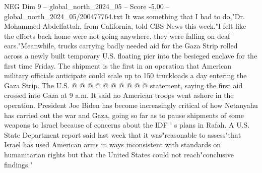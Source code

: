 \begin{textsample}{NEG Dim 9 – global\_north\_2024\_05 – Score -5.00 – global\_north\_2024\_05/200477764.txt}
It was something that I had to do,"Dr.
Mohammed Abdelfattah, from California, told CBS News this week."I felt like the efforts back home were not going anywhere, they were falling on deaf ears."Meanwhile, trucks carrying badly needed aid for the Gaza Strip rolled across a newly built temporary U.S. floating pier into the besieged enclave for the first time Friday.
The shipment is the first in an operation that American military officials anticipate could scale up to 150 truckloads a day entering the Gaza Strip.
The U.S. @ @ @ @ @ @ @ @ @ @ statement, saying the first aid crossed into Gaza at 9 a.m.
It said no American troops went ashore in the operation.
President Joe Biden has become increasingly critical of how Netanyahu has carried out the war and Gaza, going so far as to pause shipments of some weapons to Israel because of concerns about the IDF ' s plans in Rafah.
A U.S.
State Department report said last week that it was"reasonable to assess"that Israel has used American arms in ways inconsistent with standards on humanitarian rights but that the United States could not reach"conclusive findings."

\end{textsample}
